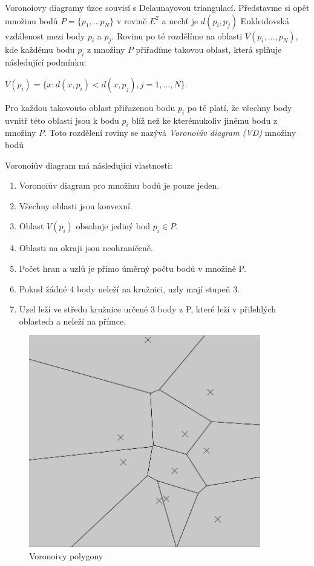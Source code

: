 \documentclass[12pt,a4paper]{article}
\begin{document}
Voronoiovy diagramy úzce souvisí s Delaunayovou triangulací. Představme si opět množinu bodů $P = \{p_1,...p_N\} $ v rovině $E^2$ a nechť je $d(p_i,p_j) $ Eukleidovská vzdálenost mezi body $p_i$ a $p_j$. Rovinu po té rozdělíme na oblasti $V(p_i,...,p_N)$, kde každému bodu $p_i$ z množiny $P$ přiřadíme takovou oblast, která splňuje následující podmínku: 

$V(p_i) = \{ x: d(x, p_i) < d(x, p_j), j = 1,...,N\}$.

Pro každou takovouto oblast přiřazenou bodu $p_i$ po té platí, že všechny body uvnitř této oblasti jsou k bodu $p_i$ blíž než ke kterémukoliv jinému bodu z množiny $P$. Toto rozdělení roviny se nazývá \textit{Voronoiův diagram (VD)} množiny bodů

\bigskip
Voronoiův diagram má následující vlastnosti: 
\begin{enumerate}
\item Voronoiův diagram pro množinu bodů je pouze jeden.
\item Všechny oblasti jsou konvexní.
\item Oblast $V(p_i)$ obsahuje jediný bod $p_i \in P$.
\item Oblasti na okraji jsou neohraničené.
\item Počet hran a uzlů je přímo úměrný počtu bodů v množině P.
\item Pokud žádné 4 body neleží na kružnici, uzly mají stupeň 3.
\item Uzel leží ve středu kružnice určené 3 body z P, které leží v přilehlých oblastech a neleží na přímce.
\end{enumerate}

\begin{figure}[h!]
\centering
\includegraphics[width=0.9\textwidth]{../img/vor_pol.png}
\caption{Voronoivy polygony}
\label{fig:vor_pol}
\end{figure}
\end{document}
